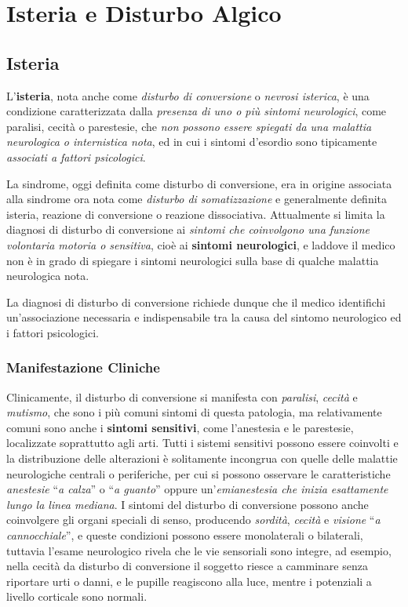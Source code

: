 \section{Isteria e Disturbo Algico}

\subsection{Isteria}

L'\textbf{isteria}, nota anche come \emph{disturbo di conversione} o
\emph{nevrosi isterica}, è una condizione caratterizzata dalla
\emph{presenza di uno o più sintomi neurologici}, come paralisi, cecità
o parestesie, che \emph{non possono essere spiegati da una malattia
neurologica o internistica nota}, ed in cui i sintomi d'esordio sono
tipicamente \emph{associati a fattori psicologici}.

La sindrome, oggi definita come disturbo di conversione, era in origine
associata alla sindrome ora nota come \emph{disturbo di somatizzazione}
e generalmente definita isteria, reazione di conversione o reazione
dissociativa. Attualmente si limita la diagnosi di disturbo di
conversione ai \emph{sintomi che coinvolgono una funzione volontaria
motoria o sensitiva}, cioè ai \textbf{sintomi neurologici}, e laddove il
medico non è in grado di spiegare i sintomi neurologici sulla base di
qualche malattia neurologica nota.

La diagnosi di disturbo di conversione richiede dunque che il medico
identifichi un'associazione necessaria e indispensabile tra la causa del
sintomo neurologico ed i fattori psicologici.

\subsubsection{Manifestazione Cliniche}

Clinicamente, il disturbo di conversione si manifesta con
\emph{paralisi}, \emph{cecità} e \emph{mutismo}, che sono i più comuni
sintomi di questa patologia, ma relativamente comuni sono anche i
\textbf{sintomi sensitivi}, come l'anestesia e le parestesie,
localizzate soprattutto agli arti. Tutti i sistemi sensitivi possono
essere coinvolti e la distribuzione delle alterazioni è solitamente
incongrua con quelle delle malattie neurologiche centrali o periferiche,
per cui si possono osservare le caratteristiche \emph{anestesie}
``\emph{a calza}'' o ``\emph{a guanto}'' oppure un'\emph{emianestesia
che inizia esattamente lungo la linea mediana}. I sintomi del disturbo
di conversione possono anche coinvolgere gli organi speciali di senso,
producendo \emph{sordità}, \emph{cecità} e \emph{visione} ``\emph{a
cannocchiale}'', e queste condizioni possono essere monolaterali o
bilaterali, tuttavia l'esame neurologico rivela che le vie sensoriali
sono integre, ad esempio, nella cecità da disturbo di conversione il
soggetto riesce a camminare senza riportare urti o danni, e le pupille
reagiscono alla luce, mentre i potenziali a livello corticale sono
normali.

